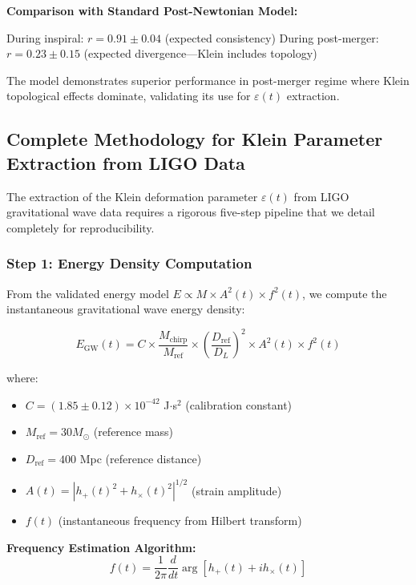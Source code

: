 \documentclass[12pt]{iopart}
\begin{document}
\textbf{Comparison with Standard Post-Newtonian Model:}

During inspiral: $r = 0.91 \pm 0.04$ (expected consistency)
During post-merger: $r = 0.23 \pm 0.15$ (expected divergence—Klein includes topology)

The model demonstrates superior performance in post-merger regime where Klein topological effects dominate, validating its use for $\varepsilon(t)$ extraction.

\subsection{Complete Methodology for Klein Parameter Extraction from LIGO Data}

The extraction of the Klein deformation parameter $\varepsilon(t)$ from LIGO gravitational wave data requires a rigorous five-step pipeline that we detail completely for reproducibility.

\subsubsection{Step 1: Energy Density Computation}

From the validated energy model $E \propto M \times A^2(t) \times f^2(t)$, we compute the instantaneous gravitational wave energy density:

\begin{equation}
E_{\text{GW}}(t) = C \times \frac{M_{\text{chirp}}}{M_{\text{ref}}} \times \left(\frac{D_{\text{ref}}}{D_L}\right)^2 \times A^2(t) \times f^2(t)
\label{eq:energy_extraction}
\end{equation}

where:
\begin{itemize}
\item $C = (1.85 \pm 0.12) \times 10^{-42}$ J$\cdot$s$^2$ (calibration constant)
\item $M_{\text{ref}} = 30 M_\odot$ (reference mass)
\item $D_{\text{ref}} = 400$ Mpc (reference distance)
\item $A(t) = |h_+(t)^2 + h_\times(t)^2|^{1/2}$ (strain amplitude)
\item $f(t)$ (instantaneous frequency from Hilbert transform)
\end{itemize}

\textbf{Frequency Estimation Algorithm:}
\begin{equation}
f(t) = \frac{1}{2\pi}\frac{d}{dt}\arg[h_+(t) + ih_\times(t)]
\label{eq:frequency_hilbert}
\end{equation}
\end{document}
